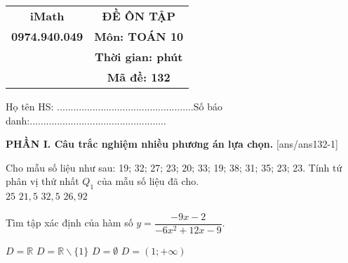 \documentclass[12pt,a4paper]{article}
\begin{document}


\begin{tabular}{cc}
{\bf iMath} & {\bf ĐỀ ÔN TẬP}\\ 
{\bf 0974.940.049} & {\bf Môn: TOÁN 10}\\  
& {\bf Thời gian:  phút}\\ 
& {\bf Mã đề: 132}\\ 
\end{tabular}

{Họ tên HS: ..................................................Số báo danh:..................................................}


{\bf PHẦN I. Câu trắc nghiệm nhiều phương án lựa chọn.}
\setcounter{ex}{0}
[ans/ans132-1]
\begin{ex}
 Cho mẫu số liệu như sau: 19; 32; 27; 23; 20; 33; 19; 38; 31; 35; 23; 23. Tính tứ phân vị thứ nhất $Q_1$ của mẫu số liệu đã cho.\\ 
\choice
{ ${25}$ }
   { \True ${21,5}$ }
     { ${32,5}$ }
    { ${26,92}$ }
\loigiai{ 
  
 }\end{ex}

\begin{ex}
 Tìm tập xác định của hàm số $y=\dfrac{- 9 x - 2}{- 6 x^{2} + 12 x - 9}$.

\choice
{ \True ${D=\mathbb{R}}$ }
   { ${D=\mathbb{R} \backslash \{1\}}$ }
     { ${D=\emptyset}$ }
    { ${D=\left(1;+\infty\right)}$ }
\end{ex}
\end{document}

